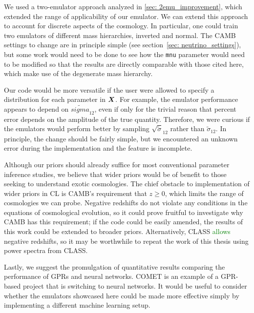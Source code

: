 We used a two-emulator approach analyzed in \ref{sec: 2emu_improvement},
which extended the range of applicability of our emulator. We can extend this
approach to account for discrete aspects of the cosmology. In particular, 
one could train two emulators of different mass hierarchies, inverted and
normal. The CAMB settings to change are in principle simple (see
section~\ref{sec: neutrino_settings}), but some work would need to be done to
see how the \texttt{mnu} parameter would need to be modified so that the
results are directly comparable with those cited here, which make use of the
degenerate mass hierarchy.

Our code would be more versatile if the user were allowed to specify a
distribution for each parameter in $\bm{X}$. For example, the emulator
performance appears to depend on $\tilde{sigma}_{12}$,
even if only for the trivial
reason that percent error depends on the amplitude of the true quantity.
Therefore, we were curious if the emulators would perform better by
sampling $\sqrt{\tilde{\sigma}}_{12}$ rather than $\tilde{\sigma}_{12}$.
In principle, the change should be fairly simple, but we encountered an
unknown error during the implementation and the feature is incomplete.



Although our priors should already suffice for most conventional parameter
inference studies, we believe that wider priors would be of benefit to those
seeking to understand exotic cosmologies. The chief obstacle to 
implementation of wider priors in CL is CAMB's requirement that $z \geq 0$,
which limits the range of cosmologies we can probe. 
Negative redshifts do not violate any conditions in the equations of
cosmological evolution, so it could prove fruitful to investigate why CAMB 
has this requirement; if the code could be easily amended, the results of
this work could be extended to broader priors. Alternatively,
CLASS \textcolor{green}{allows} negative redshifts, so it may be worthwhile 
to repeat the work of this thesis using power spectra from CLASS.

Lastly, we suggest the promulgation of quantitative results comparing the
performance of GPRs and neural networks. COMET is an example of a GPR-based
project that is switching to neural networks. It would be useful to consider
whether the emulators showcased here could be made more effective simply by
implementing a different machine learning setup. 


